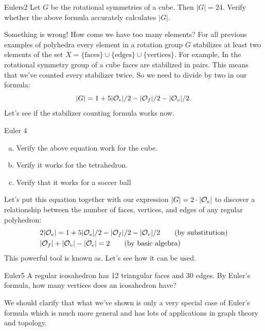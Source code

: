 \begin{exercise}{Eulers2}
Let $G$ be the rotational symmetries of a cube.  Then $|G|=24$.  Verify whether the above formula accurately calculates $|G|$.
\end{exercise}
Something is wrong!  How come we have too many elements?
For all previous examples of polyhedra every element in a rotation group $G$ stabilizes at least two elements of the set $X=\{\text{faces}\}\cup\{\text{edges}\}\cup\{\text{vertices}\}$. For example, In the rotational symmetry group of a cube faces are stabilized in pairs.  This means that we've counted every stabilizer twice. So we need to divide by two in our formula: 
$$|G| = 1+ 5|{\cal O}_e|/2-|{\cal O}_f|/2 -|{\cal O}_v|/2 .$$
Let's see if the stabilizer counting formula works now.

\begin {exercise}{Euler 4}
\begin{enumerate}[(a)]
\item Verify the above equation work for the cube.
\item Verify it works for the tetrahedron.
\item Verify that it works for a soccer ball
\end{enumerate}
\end {exercise}

Let's put this equation together with our expression $|G|=2\cdot |{\cal O}_e|$ to discover a relationship between the number of faces, vertices, and edges of any regular polyhedron:
\begin{align*}
& 2|{\cal O}_e|=1+5|{\cal O}_e|/2-|{\cal O}_f|/2-|{\cal O}_v|/2 \qquad \text{(by substitution)}\\
& |{\cal O}_f|+|{\cal O}_v|-|{\cal O}_e|=2 \qquad \text{(by basic algebra)}\\
\end {align*}
This powerful tool is known as.  Let's see how it can be used.

\begin {exercise}{Euler5}
A regular icosahedron has 12 triangular faces and 30 edges.  By Euler's formula, how many vertices does an icosahedron have?
\end {exercise}
We should clarify that what we've shown is only a very special case of Euler's formula which is much more general and has lots of applications in graph theory and topology.  

